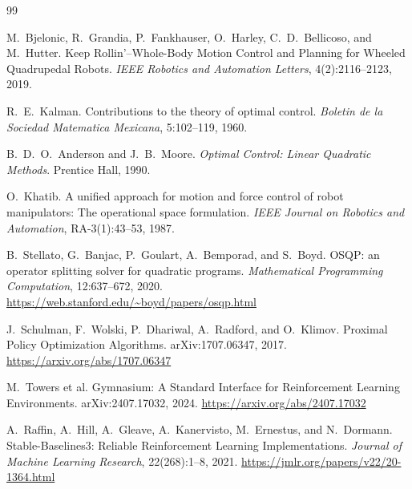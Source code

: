 \documentclass[UTF8,12pt,a4paper,fontset=none]{ctexart}
\begin{document}
\begin{thebibliography}{99}

M.~Bjelonic, R.~Grandia, P.~Fankhauser, O.~Harley, C.~D.~Bellicoso, and M.~Hutter.
\newblock Keep Rollin'--Whole-Body Motion Control and Planning for Wheeled Quadrupedal Robots.
\newblock \emph{IEEE Robotics and Automation Letters}, 4(2):2116--2123, 2019.

R.~E.~Kalman.
\newblock Contributions to the theory of optimal control.
\newblock \emph{Boletin de la Sociedad Matematica Mexicana}, 5:102--119, 1960.

B.~D.~O.~Anderson and J.~B.~Moore.
\newblock \emph{Optimal Control: Linear Quadratic Methods}.
\newblock Prentice Hall, 1990.

O.~Khatib.
\newblock A unified approach for motion and force control of robot manipulators: The operational space formulation.
\newblock \emph{IEEE Journal on Robotics and Automation}, RA-3(1):43--53, 1987.

B.~Stellato, G.~Banjac, P.~Goulart, A.~Bemporad, and S.~Boyd.
\newblock OSQP: an operator splitting solver for quadratic programs.
\newblock \emph{Mathematical Programming Computation}, 12:637--672, 2020.
\newblock \url{https://web.stanford.edu/~boyd/papers/osqp.html}

J.~Schulman, F.~Wolski, P.~Dhariwal, A.~Radford, and O.~Klimov.
\newblock Proximal Policy Optimization Algorithms.
\newblock arXiv:1707.06347, 2017.
\newblock \url{https://arxiv.org/abs/1707.06347}

M.~Towers et al.
\newblock Gymnasium: A Standard Interface for Reinforcement Learning Environments.
\newblock arXiv:2407.17032, 2024.
\newblock \url{https://arxiv.org/abs/2407.17032}

A.~Raffin, A.~Hill, A.~Gleave, A.~Kanervisto, M.~Ernestus, and N.~Dormann.
\newblock Stable-Baselines3: Reliable Reinforcement Learning Implementations.
\newblock \emph{Journal of Machine Learning Research}, 22(268):1--8, 2021.
\newblock \url{https://jmlr.org/papers/v22/20-1364.html}

\end{thebibliography}
\end{document}
